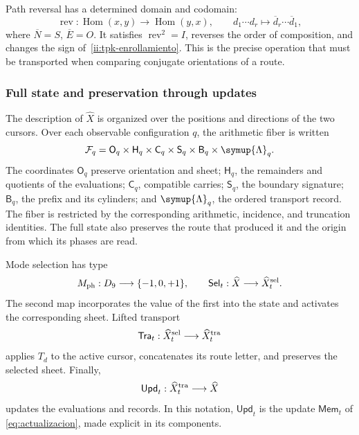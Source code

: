 Path reversal has a determined domain and codomain:
\[
 \operatorname{rev}:\operatorname{Hom}(x,y)
 \longrightarrow\operatorname{Hom}(y,x),\qquad
 d_1\cdots d_r\longmapsto\overline d_r\cdots\overline d_1,
\]
where \(\overline N=S\), \(\overline E=O\). It satisfies
\(\operatorname{rev}^2=I\), reverses the order of composition, and changes the
sign of~\eqref{ii:tpk-enrollamiento}. This is the precise operation that
must be transported when comparing conjugate orientations of a route.

\subsubsection{Full state and preservation through updates}

The description of \(\widehat X\) is organized over the positions and
directions of the two cursors. Over each observable configuration
\(q\), the arithmetic fiber is written
\begin{equation}
 \mathcal F_q=
 \mathsf O_q\times\mathsf H_q\times\mathsf C_q\times
 \mathsf S_q\times\mathsf B_q\times\symup{\Lambda}_q.
 \label{ii:tpk-fibra}
\end{equation}
The coordinates \(\mathsf O_q\) preserve orientation and sheet;
\(\mathsf H_q\), the remainders and quotients of the evaluations;
\(\mathsf C_q\), compatible carries;
\(\mathsf S_q\), the boundary signature;
\(\mathsf B_q\), the prefix and its cylinders; and
\(\symup{\Lambda}_q\), the ordered transport record. The fiber is
restricted by the corresponding arithmetic, incidence, and
truncation identities. The full state also preserves the route
that produced it and the origin from which its phases are read.

Mode selection has type
\[
 M_{\rm ph}:D_9\longrightarrow\{-1,0,+1\},\qquad
 \mathsf{Sel}_t:\widehat X\longrightarrow\widehat X^{\rm sel}_t.
\]
The second map incorporates the value of the first into the state and
activates the corresponding sheet. Lifted transport
\[
 \mathsf{Tra}_t:\widehat X^{\rm sel}_t
 \longrightarrow\widehat X^{\rm tra}_t
\]
applies \(T_d\) to the active cursor, concatenates its route letter, and preserves the
selected sheet. Finally,
\[
 \mathsf{Upd}_t:\widehat X^{\rm tra}_t\longrightarrow\widehat X
\]
updates the evaluations and records. In this notation,
\(\mathsf{Upd}_t\) is the update \(\mathsf{Mem}_t\) of
\eqref{eq:actualizacion}, made explicit in its components.

